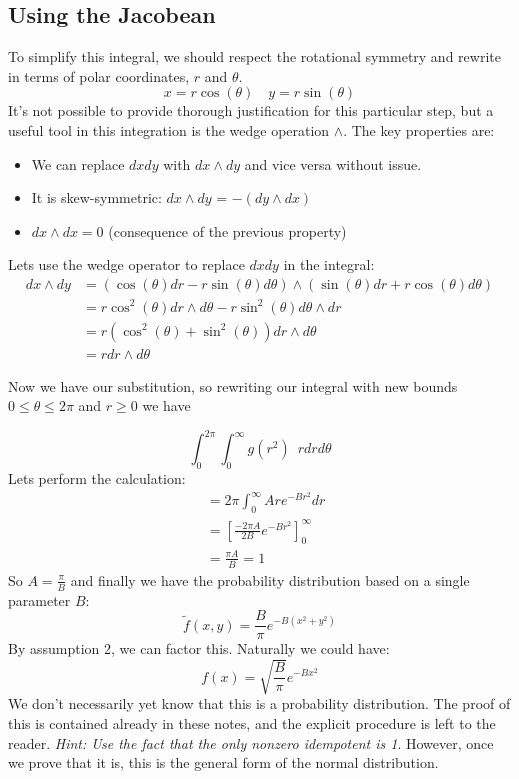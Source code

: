 \documentclass{article}
\begin{document}
\subsection{Using the Jacobean}
To simplify this integral, we should respect the rotational symmetry and rewrite in terms of
polar coordinates, $r$ and $\theta$.
\[x = r \cos(\theta) \quad y = r \sin(\theta)\]
It's not possible to provide thorough justification for this particular step, but a useful tool in this
integration is the wedge operation $\wedge$. The key properties are:
\begin{itemize}
    \item We can replace $dxdy$ with $dx\wedge dy$
and vice versa without issue. 

    \item It is skew-symmetric: $dx \wedge dy$ = $- \left(dy \wedge dx\right)$
    
    \item $dx \wedge dx = 0$ (consequence of the previous property)
\end{itemize}

Lets use the wedge operator to replace $dxdy$ in the integral:
\begin{align*}
    dx\wedge dy &= (\cos(\theta)dr - r\sin(\theta)d\theta)\wedge(\sin(\theta)dr + r\cos(\theta)d\theta) \\
    &= r\cos^2(\theta)dr\wedge d\theta - r \sin^2(\theta) d\theta \wedge dr \\
    &= r\left(\cos^2(\theta) + \sin^2(\theta)\right) dr \wedge d\theta \\
    &= r dr \wedge d\theta
\end{align*}


Now we have our substitution, so rewriting our integral with new bounds $0 \leq \theta \leq 2\pi$ and $r \geq 0$ we have 

\[\int_{0}^{2\pi}\int_{0}^{\infty} g(r^2) \enspace r dr d\theta\]
Lets perform the calculation:
\begin{align*}
    &= 2\pi \int_{0}^\infty Ar e^{-Br^2} dr \\
    &=\left[\frac{-2\pi A}{2B} e^{-Br^2}\right]^\infty_0 \\
    &= \frac{\pi A}{B} = 1
\end{align*}
So $A = \frac{\pi}{B}$ and finally we have the probability distribution based on a single parameter $B$:
\[\tilde f(x,y) = \frac{B}{\pi} e^{-B(x^2 + y ^2)}\]
By assumption 2, we can factor this. Naturally we could have:
\[f(x) = \sqrt{\frac{B}{\pi}} e^{-Bx^2}\]
We don't necessarily yet know that this is a probability distribution. The proof of this is contained already in 
these notes, and the explicit procedure is left to the reader. \emph{Hint: Use the fact that the only nonzero idempotent is 1}.
However, once we prove that it is, this is the general form of the normal distribution.
\end{document}
